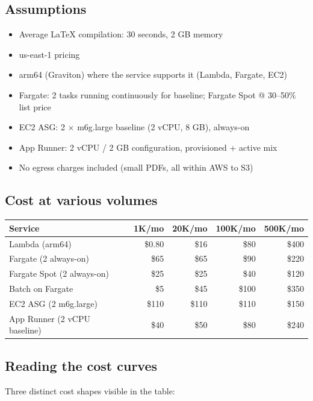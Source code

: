 \documentclass[11pt,letterpaper]{article}
\begin{document}
\subsection{Assumptions}
\begin{itemize}[nosep]
  \item Average LaTeX compilation: 30 seconds, 2 GB memory
  \item us-east-1 pricing
  \item arm64 (Graviton) where the service supports it (Lambda, Fargate, EC2)
  \item Fargate: 2 tasks running continuously for baseline; Fargate Spot @ 30--50\% list price
  \item EC2 ASG: 2 $\times$ m6g.large baseline (2 vCPU, 8 GB), always-on
  \item App Runner: 2 vCPU / 2 GB configuration, provisioned + active mix
  \item No egress charges included (small PDFs, all within AWS to S3)
\end{itemize}

\subsection{Cost at various volumes}

{\small
\begin{center}
\begin{tabular}{@{}lrrrr@{}}
\toprule
\textbf{Service} & \textbf{1K/mo} & \textbf{20K/mo} & \textbf{100K/mo} & \textbf{500K/mo}\\
\midrule
Lambda (arm64) & \$0.80 & \$16 & \$80 & \$400 \\
Fargate (2 always-on) & \$65 & \$65 & \$90 & \$220 \\
Fargate Spot (2 always-on) & \$25 & \$25 & \$40 & \$120 \\
Batch on Fargate & \$5 & \$45 & \$100 & \$350 \\
EC2 ASG (2 m6g.large) & \$110 & \$110 & \$110 & \$150 \\
App Runner (2 vCPU baseline) & \$40 & \$50 & \$80 & \$240 \\
\bottomrule
\end{tabular}
\end{center}
}

\subsection{Reading the cost curves}
Three distinct cost shapes visible in the table:
\end{document}
